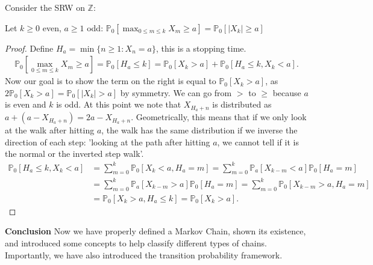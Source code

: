 Consider the SRW on $\mathbb{Z}$: 

\begin{prop}[]
Let $k\geq 0$ even, $a\geq1$ odd: $\mathbb{P}_{0} \left[ \max_{0 \leq m \leq k} X_m \geq a \right] = \mathbb{P}_{0} \left[ |X_k|\geq a \right]  $
\end{prop}
\begin{proof}
	Define $H_a= \min\{n \geq 1: X_n =a\}$, this is a stopping time.
	\begin{align}
		\mathbb{P}_{0} \left[ \max_{0 \leq m \leq k}X_m \geq a \right] = \mathbb{P}_{0} \left[ H_a \leq k \right] = \mathbb{P}_{0} \left[ X_k > a \right]  + \mathbb{P}_{0} \left[ H_a \leq k, X_k < a \right] 
		.\end{align}		
		Now our goal is to show the term on the right is equal to $\mathbb{P}_{0} \left[ X_k > a \right] $, as $2\mathbb{P}_{0} \left[ X_k > a \right] = \mathbb{P}_{0} \left[ |X_k| >a \right] $ by symmetry. We can go from $>$ to $\geq$ because $a$ is even and $k$ is odd. At this point we note that $X_{H_a +n}$ is distributed as $a + (a-X_{H_a +n}) = 2a - X_{H_a +n}$. Geometrically, this means that if we only look at the walk after hitting $a$, the walk has the same distribution if we inverse the direction of each step: 'looking at the path after hitting $a$, we cannot tell if it is the normal or the inverted step walk'.
	\begin{align}
		\mathbb{P}_{0} \left[ H_a \leq k, X_k < a \right] &= \sum_{m=0}^{k} \mathbb{P}_{0} \left[ X_k < a, H_a = m \right] = \sum_{m=0}^{k} \mathbb{P}_{a} \left[ X_{k-m} < a \right] \mathbb{P}_{0} \left[ H_a = m \right]  \\
		&= \sum_{m=0}^{k} \mathbb{P}_{a} \left[ X_{k-m}>a \right] \mathbb{P}_{0} \left[ H_a = m \right] = 
			 \sum_{m=0}^{k} \mathbb{P}_{0} \left[ X_{k-m}>a, H_a =m \right] \\
		&= \mathbb{P}_{0} \left[ X_k >a, H_a \leq k \right] = \mathbb{P}_{0} \left[ X_k > a \right]  
	 .\end{align}	
\end{proof}


\noindent
\textbf{Conclusion} Now we have properly defined a Markov Chain, shown its existence, and introduced some concepts to help classify different types of chains. Importantly, we have also introduced the transition probability framework. 



